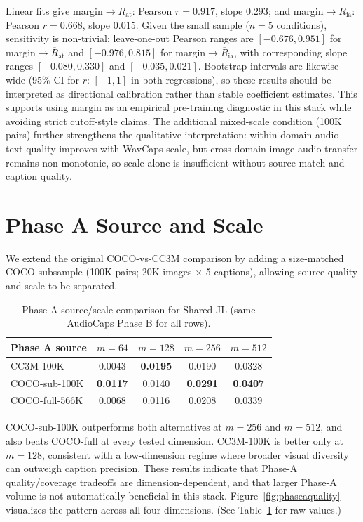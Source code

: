 \documentclass{article}
\newcommand{\avgR}{\overline{R}}
\begin{document}
Linear fits give margin$\to\avgR_\mathrm{at}$: Pearson $r=0.917$, slope $0.293$;
and margin$\to\avgR_\mathrm{ia}$: Pearson $r=0.668$, slope $0.015$.
Given the small sample ($n=5$ conditions), sensitivity is non-trivial: leave-one-out Pearson ranges are
$[-0.676, 0.951]$ for margin$\to\avgR_\mathrm{at}$ and $[-0.976, 0.815]$ for margin$\to\avgR_\mathrm{ia}$, with corresponding slope ranges $[-0.080, 0.330]$ and $[-0.035, 0.021]$.
Bootstrap intervals are likewise wide (95\% CI for $r$: $[-1,1]$ in both regressions), so these results should be interpreted as directional calibration rather than stable coefficient estimates.
This supports using margin as an empirical pre-training diagnostic in this stack while avoiding strict cutoff-style claims.
The additional mixed-scale condition (100K pairs) further strengthens the qualitative interpretation:
within-domain audio-text quality improves with WavCaps scale, but cross-domain image-audio transfer remains non-monotonic, so scale alone is insufficient without source-match and caption quality.

\section{Phase A Source and Scale}
\label{app:domain}

We extend the original COCO-vs-CC3M comparison by adding a size-matched COCO subsample (100K pairs; 20K images $\times$ 5 captions), allowing source quality and scale to be separated.

\begin{table}[ht]
  \caption{Phase A source/scale comparison for Shared JL (same AudioCaps Phase B for all rows).}
  \label{tab:phasea_w14}
  \centering
  \footnotesize
  \begin{tabular}{lcccc}
    \toprule
    Phase A source & $m=64$ & $m=128$ & $m=256$ & $m=512$ \\
    \midrule
    CC3M-100K & 0.0043 & \textbf{0.0195} & 0.0190 & 0.0328 \\
    COCO-sub-100K & \textbf{0.0117} & 0.0140 & \textbf{0.0291} & \textbf{0.0407} \\
    COCO-full-566K & 0.0068 & 0.0116 & 0.0208 & 0.0339 \\
    \bottomrule
  \end{tabular}
\end{table}

COCO-sub-100K outperforms both alternatives at $m=256$ and $m=512$, and also beats COCO-full at every tested dimension.
CC3M-100K is better only at $m=128$, consistent with a low-dimension regime where broader visual diversity can outweigh caption precision.
These results indicate that Phase-A quality/coverage tradeoffs are dimension-dependent, and that larger Phase-A volume is not automatically beneficial in this stack.
Figure~\ref{fig:phaseaquality} visualizes the pattern across all four dimensions.
(See Table~\ref{tab:phasea_w14} for raw values.)
\end{document}

